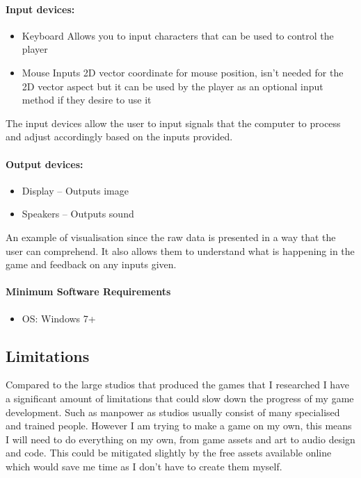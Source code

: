 \documentclass{article}
\begin{document}
\paragraph{Input devices:}
\begin{itemize}
\item Keyboard \linebreak 
Allows you to input characters that can be used to control the player
\item Mouse \linebreak
Inputs 2D vector coordinate for mouse position, isn't needed for the 2D vector aspect but it can be used by the player as an optional input method if they desire to use it
\end{itemize}
The input devices allow the user to input signals that the computer to process and adjust accordingly based on the inputs provided.

\paragraph{Output devices:}
\begin{itemize}
\item Display – Outputs image 
\item Speakers – Outputs sound 
\end{itemize}
An example of visualisation since the raw data is presented in a way that the user can comprehend. It also allows them to understand what is happening in the game and feedback on any inputs given.

\paragraph{Minimum Software Requirements}
\begin{itemize}
\item OS: Windows 7+
\end{itemize}


\subsection{Limitations}
Compared to the large studios that produced the games that I researched I have a significant amount of limitations that could slow down the progress of my game development. Such as manpower as studios usually consist of many specialised and trained people. However I am trying to make a game on my own, this means I will need to do everything on my own, from game assets and art to audio design and code. This could be mitigated slightly by the free assets available online which would save me time as I don't have to create them myself.
\end{document}
